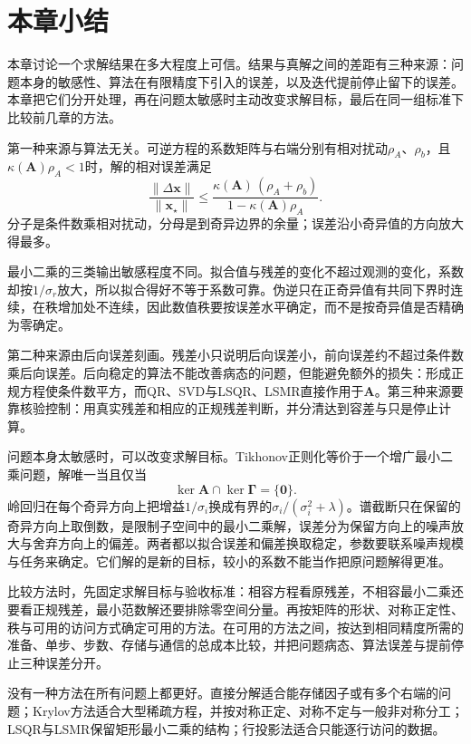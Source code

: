 \FloatBarrier
\section{本章小结}
\label{sec:solution-error-chapter-summary}

本章讨论一个求解结果在多大程度上可信。结果与真解之间的差距有三种来源：问题本身的敏感性、算法在有限精度下引入的误差，以及迭代提前停止留下的误差。本章把它们分开处理，再在问题太敏感时主动改变求解目标，最后在同一组标准下比较前几章的方法。

第一种来源与算法无关。可逆方程的系数矩阵与右端分别有相对扰动$\rho_A$、$\rho_b$，且$\kappa(\bm A)\rho_A<1$时，解的相对误差满足
\[
 \frac{\lVert\Delta\bm x\rVert}{\lVert\bm x_\star\rVert}\leq\frac{\kappa(\bm A)\,(\rho_A+\rho_b)}{1-\kappa(\bm A)\rho_A}.
\]
分子是条件数乘相对扰动，分母是到奇异边界的余量；误差沿小奇异值的方向放大得最多。

最小二乘的三类输出敏感程度不同。拟合值与残差的变化不超过观测的变化，系数却按$1/\sigma_r$放大，所以拟合得好不等于系数可靠。伪逆只在正奇异值有共同下界时连续，在秩增加处不连续，因此数值秩要按误差水平确定，而不是按奇异值是否精确为零确定。

第二种来源由后向误差刻画。残差小只说明后向误差小，前向误差约不超过条件数乘后向误差。后向稳定的算法不能改善病态的问题，但能避免额外的损失：形成正规方程使条件数平方，而QR、SVD与LSQR、LSMR直接作用于$\bm A$。第三种来源要靠核验控制：用真实残差和相应的正规残差判断，并分清达到容差与只是停止计算。

问题本身太敏感时，可以改变求解目标。Tikhonov正则化等价于一个增广最小二乘问题，解唯一当且仅当
\[
 \ker\bm A\cap\ker\bm\Gamma=\{\bm0\}.
\]
岭回归在每个奇异方向上把增益$1/\sigma_i$换成有界的$\sigma_i/(\sigma_i^2+\lambda)$。谱截断只在保留的奇异方向上取倒数，是限制子空间中的最小二乘解，误差分为保留方向上的噪声放大与舍弃方向上的偏差。两者都以拟合误差和偏差换取稳定，参数要联系噪声规模与任务来确定。它们解的是新的目标，较小的系数不能当作把原问题解得更准。

比较方法时，先固定求解目标与验收标准：相容方程看原残差，不相容最小二乘还要看正规残差，最小范数解还要排除零空间分量。再按矩阵的形状、对称正定性、秩与可用的访问方式确定可用的方法。在可用的方法之间，按达到相同精度所需的准备、单步、步数、存储与通信的总成本比较，并把问题病态、算法误差与提前停止三种误差分开。

没有一种方法在所有问题上都更好。直接分解适合能存储因子或有多个右端的问题；Krylov方法适合大型稀疏方程，并按对称正定、对称不定与一般非对称分工；LSQR与LSMR保留矩形最小二乘的结构；行投影法适合只能逐行访问的数据。
